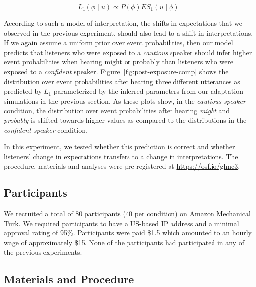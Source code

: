 \documentclass[lucida,biblatex]{sp} %
\begin{document}
$$ L_1(\phi \mid u) \propto P(\phi) ES_1(u \mid \phi)$$

According to such a model of interpretation, the shifts in expectations that we observed in the previous experiment, should also lead to a shift in interpretations. 
If we again assume a uniform prior over event probabilities, then our model predicts that listeners who were exposed to a \textit{cautious} speaker should infer 
higher event probabilities when hearing {\sc might} or {\sc probably} than listeners who were exposed to a \textit{confident} speaker. Figure~\ref{fig:post-exposure-comp}
shows the distribution over event probabilities after hearing three different utterances as predicted by $L_1$ parameterized by the inferred parameters from our
adaptation simulations in the previous section. As these plots show, in the \textit{cautious speaker} condition, the distribution over event probabilities after hearing \textit{might} 
and \textit{probably} is shifted towards higher values as compared to the distributions in the \textit{confident speaker} condition. 

In this experiment, we tested whether this prediction is correct and whether listeners' change in expectations transfers to a change in interpretations. 
The procedure, materials and analyses were pre-registered at \url{https://osf.io/ghnc3}.

\subsection{Participants}

We recruited a total of 80 participants (40 per condition) on Amazon Mechanical Turk. We required participants to have a US-based IP address and a minimal approval rating of 95\%. Participants were paid \$1.5 which amounted to an hourly wage of approximately \$15. None of the participants had participated in any of the previous experiments. 

\subsection{Materials and Procedure}
\end{document}
